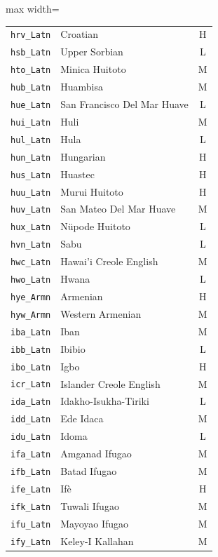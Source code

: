 {\begin{adjustbox}{max width=\textwidth}
\begin{tabular}{llc}
        \texttt{hrv\_Latn} & Croatian & H \\
        \texttt{hsb\_Latn} & Upper Sorbian & L \\
        \texttt{hto\_Latn} & Minica Huitoto & M \\
        \texttt{hub\_Latn} & Huambisa & M \\
        \texttt{hue\_Latn} & San Francisco Del Mar Huave & L \\
        \texttt{hui\_Latn} & Huli & M \\
        \texttt{hul\_Latn} & Hula & L \\
        \texttt{hun\_Latn} & Hungarian & H \\
        \texttt{hus\_Latn} & Huastec & H \\
        \texttt{huu\_Latn} & Murui Huitoto & H \\
        \texttt{huv\_Latn} & San Mateo Del Mar Huave & M \\
        \texttt{hux\_Latn} & Nüpode Huitoto & L \\
        \texttt{hvn\_Latn} & Sabu & L \\
        \texttt{hwc\_Latn} & Hawai'i Creole English & M \\
        \texttt{hwo\_Latn} & Hwana & L \\
        \texttt{hye\_Armn} & Armenian & H \\
        \texttt{hyw\_Armn} & Western Armenian & M \\
        \texttt{iba\_Latn} & Iban & M \\
        \texttt{ibb\_Latn} & Ibibio & L \\
        \texttt{ibo\_Latn} & Igbo & H \\
        \texttt{icr\_Latn} & Islander Creole English & M \\
        \texttt{ida\_Latn} & Idakho-Isukha-Tiriki & L \\
        \texttt{idd\_Latn} & Ede Idaca & M \\
        \texttt{idu\_Latn} & Idoma & L \\
        \texttt{ifa\_Latn} & Amganad Ifugao & M \\
        \texttt{ifb\_Latn} & Batad Ifugao & M \\
        \texttt{ife\_Latn} & Ifè & H \\
        \texttt{ifk\_Latn} & Tuwali Ifugao & M \\
        \texttt{ifu\_Latn} & Mayoyao Ifugao & M \\
        \texttt{ify\_Latn} & Keley-I Kallahan & M \\

\end{tabular}
\end{adjustbox}}
